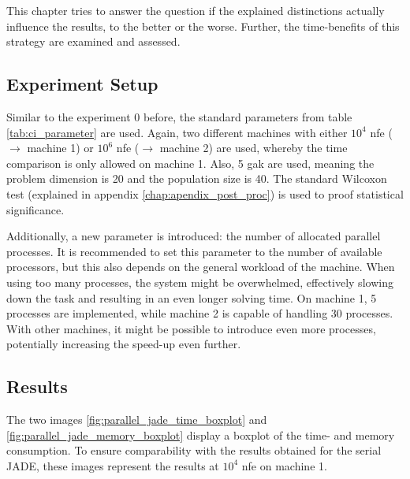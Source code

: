 \documentclass[./\jobname.tex]{subfiles}
\begin{document}
This chapter tries to answer the question if the explained distinctions actually influence the results, to the better or the worse. Further, the time-benefits of this strategy are examined and assessed.

\subsection{Experiment Setup}
Similar to the experiment 0 before, the standard parameters from table \ref{tab:ci_parameter} are used. Again, two different machines with either $10^4$ \gls{nfe} ($\rightarrow$ machine 1) or $10^6$ \gls{nfe} ($\rightarrow$ machine 2) are used, whereby the time comparison is only allowed on machine 1. Also, 5 \gls{gak} are used, meaning the problem dimension is 20 and the population size is 40. The standard Wilcoxon test (explained in appendix \ref{chap:apendix_post_proc}) is used to proof statistical significance. 

Additionally, a new parameter is introduced: the number of allocated parallel processes. It is recommended to set this parameter to the number of available processors, but this also depends on the general workload of the machine. When using too many processes, the system might be overwhelmed, effectively slowing down the task and resulting in an even longer solving time. On machine 1, 5 processes are implemented, while machine 2 is capable of handling 30 processes. With other machines, it might be possible to introduce even more processes, potentially increasing the speed-up even further. 

\subsection{Results}

The two images \ref{fig:parallel_jade_time_boxplot} and \ref{fig:parallel_jade_memory_boxplot} display a boxplot of the time- and memory consumption. To ensure comparability with the results obtained for the serial JADE, these images represent the results at $10^4$ \gls{nfe} on machine 1. 
\end{document}
